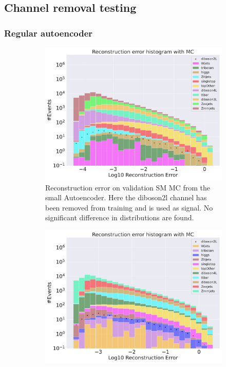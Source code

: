 \subsection*{Channel removal testing}
\subsubsection*{Regular autoencoder}

\begin{figure}[h!]
    \centering
    \begin{subfigure}{.45\textwidth}
        \includegraphics[width=\textwidth]{Figures/AE_testing/small/b_data_recon_big_rm3_feats_sig_diboson2l.pdf}
        \caption{Reconstruction error on validation SM MC from the small Autoencoder. Here the diboson2l channel has been removed from training and 
        is used as signal. No significant difference in distributions are found.}
        \label{fig:ae_small_diboson2l}
    \end{subfigure}
    \hfill 
    \begin{subfigure}{.45\textwidth}
        \includegraphics[width=\textwidth]{Figures/AE_testing/big/b_data_recon_big_rm3_feats_sig_diboson2l.pdf}

\end{subfigure}
\end{figure}
